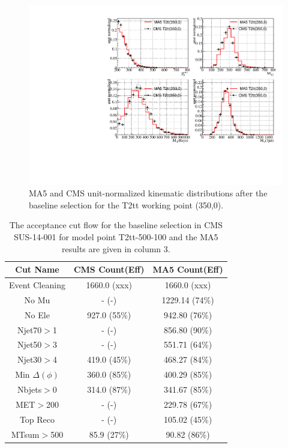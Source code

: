    \begin{figure}
  \caption{MA5 and CMS unit-normalized kinematic distributions after the baseline
    selection for the T2tt working point (350,0).}
  \centering
    \includegraphics[width=\textwidth]{figures/Appendices/Ma5ValidationSUS13012/T2tt-350-0.pdf}
\end{figure}



\begin{table}
    \begin{centering}
    \begin{tabular}{  c | c | c  }
    \hline
    \hline
    Cut Name & CMS Count(Eff) & MA5 Count(Eff)\\
    \hline
        Event Cleaning & 1660.0 (xxx) & 1660.0 (xxx)\\
    No Mu & - (-) & 1229.14 (74\%)\\
    No Ele & 927.0 (55\%) & 942.80 (76\%)\\
    Njet70$>$1 & - (-) & 856.80 (90\%)\\
    Njet50$>$3 & - (-) & 551.71 (64\%)\\
    Njet30$>$4 & 419.0 (45\%) & 468.27 (84\%)\\
    Min $\Delta(\phi)$ & 360.0 (85\%) & 400.29 (85\%)\\
    Nbjets$>$0 & 314.0 (87\%) & 341.67 (85\%)\\
    MET$>$200 & - (-) & 229.78 (67\%)\\
    Top Reco & - (-) & 105.02 (45\%)\\
    MTsum$>$500 & 85.9 (27\%) & 90.82 (86\%)\\
\hline
    \hline
    \end{tabular}
    \caption{The acceptance cut flow for the baseline selection in CMS SUS-14-001 for
    model point T2tt-500-100 and the MA5 results are given in column 3.}
    \label{table:T2tt-500-100}
    \end{centering}
    \end{table}

